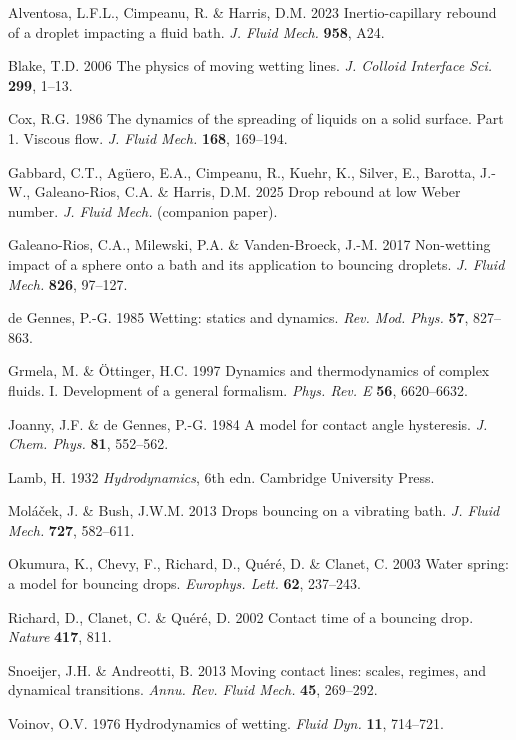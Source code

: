 \documentclass{jfm}
\begin{document}

\begin{thebibliography}{}

Alventosa, L.F.L., Cimpeanu, R. \& Harris, D.M. 2023 Inertio-capillary rebound of a
droplet impacting a fluid bath. \emph{J. Fluid Mech.} \textbf{958}, A24.

Blake, T.D. 2006 The physics of moving wetting lines. \emph{J. Colloid Interface Sci.}
\textbf{299}, 1--13.

Cox, R.G. 1986 The dynamics of the spreading of liquids on a solid surface. Part 1.
Viscous flow. \emph{J. Fluid Mech.} \textbf{168}, 169--194.

Gabbard, C.T., Ag\"uero, E.A., Cimpeanu, R., Kuehr, K., Silver, E., Barotta, J.-W.,
Galeano-Rios, C.A. \& Harris, D.M. 2025 Drop rebound at low Weber number.
\emph{J. Fluid Mech.} (companion paper).

Galeano-Rios, C.A., Milewski, P.A. \& Vanden-Broeck, J.-M. 2017 Non-wetting impact of a
sphere onto a bath and its application to bouncing droplets. \emph{J. Fluid Mech.}
\textbf{826}, 97--127.

de Gennes, P.-G. 1985 Wetting: statics and dynamics. \emph{Rev. Mod. Phys.} \textbf{57},
827--863.

Grmela, M. \& \"Ottinger, H.C. 1997 Dynamics and thermodynamics of complex fluids. I.
Development of a general formalism. \emph{Phys. Rev. E} \textbf{56}, 6620--6632.

Joanny, J.F. \& de Gennes, P.-G. 1984 A model for contact angle hysteresis.
\emph{J. Chem. Phys.} \textbf{81}, 552--562.

Lamb, H. 1932 \emph{Hydrodynamics}, 6th edn. Cambridge University Press.

Mol\'a\v{c}ek, J. \& Bush, J.W.M. 2013 Drops bouncing on a vibrating bath.
\emph{J. Fluid Mech.} \textbf{727}, 582--611.

Okumura, K., Chevy, F., Richard, D., Qu\'er\'e, D. \& Clanet, C. 2003 Water spring: a
model for bouncing drops. \emph{Europhys. Lett.} \textbf{62}, 237--243.

Richard, D., Clanet, C. \& Qu\'er\'e, D. 2002 Contact time of a bouncing drop.
\emph{Nature} \textbf{417}, 811.

Snoeijer, J.H. \& Andreotti, B. 2013 Moving contact lines: scales, regimes, and
dynamical transitions. \emph{Annu. Rev. Fluid Mech.} \textbf{45}, 269--292.

Voinov, O.V. 1976 Hydrodynamics of wetting. \emph{Fluid Dyn.} \textbf{11}, 714--721.

\end{thebibliography}
\end{document}
